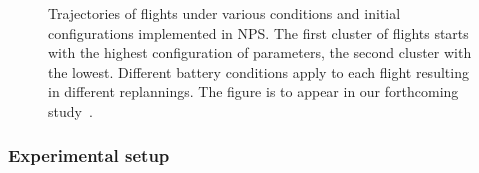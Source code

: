 \begin{figure}[p!]
  \centering
  \selectfont
  \footnotesize    
  
  \caption[Trajectories of flights under various conditions and initial configurations in NPS]{Trajectories of flights under various conditions and initial configurations implemented in NPS. The first cluster of flights  starts with the highest configuration of parameters, the second cluster  with the lowest. Different battery conditions apply to each flight resulting in different replannings. The figure is to appear in our forthcoming study~\citep{seewald202Xenergy}.}
  \label{fig:trajs-pprz}
\end{figure}

\subsubsection*{Experimental setup}

